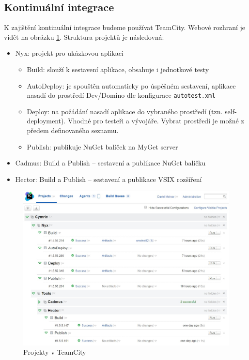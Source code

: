\subsection{Kontinuální integrace}
\label{ch:ciserver}
K zajištění kontinuální integrace budeme používat TeamCity. Webové rozhraní je vidět na obrázku \ref{fig:cymric_teamcity}. Struktura projektů je následovná:
\begin{itemize}
\item Nyx: projekt pro ukázkovou aplikaci
\begin{itemize}
\item Build: slouží k sestavení aplikace, obsahuje i jednotkové testy
\item AutoDeploy: je spouštěn automaticky po úspěšném sestavení, aplikace nasadí do prostředí Dev/Domino dle konfigurace \texttt{autotest.xml}
\item Deploy: na požádání nasadí aplikace do vybraného prostředí (tzn. self-deployment). Vhodné pro testeři a vývojáře. Vybrat prostředí je možné z předem definovaného seznamu.
\item Publish: publikuje NuGet balíček na MyGet server
\end{itemize}
\item Cadmus: Build a Publish -- sestavení a publikace NuGet balíčku
\item Hector: Build a Publish -- sestavení a publikace VSIX rozšíření
\end{itemize}

\begin{figure}[]
  \centering
  \includegraphics[width=15cm]{fig/teamcity.jpg}
  \caption{Projekty v TeamCity}
  \label{fig:cymric_teamcity}
\end{figure}

